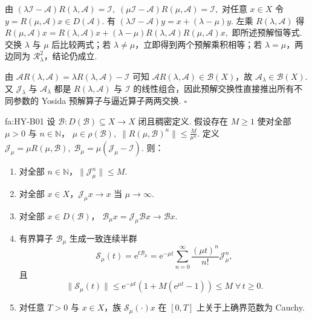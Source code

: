 \begin{FAProof}
由 \(\displaystyle (\lambda\mathcal I-\mathcal A)R(\lambda,\mathcal A)=\mathcal I, \; (\mu\mathcal I-\mathcal A)R(\mu,\mathcal A)=\mathcal I,\)
对任意 \(\displaystyle x\in X\) 令 \(\displaystyle y=R(\mu,\mathcal A)x\in D(\mathcal A)\). 有 \(\displaystyle (\lambda\mathcal I-\mathcal A)y = x+(\lambda-\mu)y.\)
左乘 \(\displaystyle R(\lambda,\mathcal A)\) 得 \(\displaystyle R(\mu,\mathcal A)x = R(\lambda,\mathcal A)x +(\lambda-\mu)R(\lambda,\mathcal A)R(\mu,\mathcal A)x,\)
即所述预解恒等式. 交换 \(\displaystyle\lambda\) 与 \(\displaystyle\mu\) 后比较两式；若 \(\displaystyle\lambda\neq\mu\)，立即得到两个预解乘积相等；若 \(\displaystyle\lambda=\mu\)，两边同为 \(\displaystyle\mathcal R_\lambda^2\)，结论仍成立.

由 \(\displaystyle \mathcal A R(\lambda,\mathcal A) = \lambda R(\lambda,\mathcal A)-\mathcal I\)
可知 \(\displaystyle\mathcal A R(\lambda,\mathcal A)\in\mathcal B(X)\)，故 \(\displaystyle\mathcal A_\lambda\in\mathcal B(X)\). 又 \(\displaystyle\mathcal J_\lambda\) 与 \(\displaystyle\mathcal A_\lambda\) 都是 \(\displaystyle R(\lambda,\mathcal A)\) 与 \(\displaystyle\mathcal I\) 的线性组合，因此预解交换性直接推出所有不同参数的 Yosida 预解算子与逼近算子两两交换.
\hfill\(\square\)
\end{FAProof}

\begin{FAProposition}{fa:HY-B01}
设 \(\displaystyle \mathcal B:D(\mathcal B)\subseteq X\to X\)
闭且稠密定义. 假设存在 \(\displaystyle M\geqslant1\) 使对全部 \(\displaystyle\mu>0\) 与 \(\displaystyle n\in\mathbb N\)， \(\displaystyle \mu\in\rho(\mathcal B), \; \|R(\mu,\mathcal B)^n\| \leqslant \frac{M}{\mu^n}.\)
定义 \(\displaystyle \mathcal J_\mu=\mu R(\mu,\mathcal B), \; \mathcal B_\mu=\mu(\mathcal J_\mu-\mathcal I).\)
则：
\begin{enumerate}[label=\textnormal{(\roman*)}]
\item 对全部 \(\displaystyle n\in\mathbb N\)，\(\displaystyle\|\mathcal J_\mu^n\|\leqslant M\).
\item 对全部 \(\displaystyle x\in X\)，\(\displaystyle\mathcal J_\mu x\to x\) 当 \(\displaystyle\mu\to\infty\).
\item 对全部 \(\displaystyle x\in D(\mathcal B)\)， \(\displaystyle \mathcal B_\mu x = \mathcal J_\mu\mathcal Bx \longrightarrow \mathcal Bx.\)
\item 有界算子 \(\displaystyle\mathcal B_\mu\) 生成一致连续半群
\[
\mathcal S_\mu(t)
=
\mathrm{e}^{t\mathcal B_\mu}
=
\mathrm{e}^{-\mu t}
\sum_{n=0}^{\infty}
\frac{(\mu t)^n}{n!}\mathcal J_\mu^n,
\]
且
\[
\|\mathcal S_\mu(t)\|
\leqslant
\mathrm{e}^{-\mu t}
\left(1+M(\mathrm{e}^{\mu t}-1)\right)
\leqslant M
\;
\forall\,t\geqslant0.
\]
\item 对任意 \(\displaystyle T>0\) 与 \(\displaystyle x\in X\)，族 \(\displaystyle\mathcal S_\mu(\cdot)x\) 在 \(\displaystyle[0,T]\) 上关于上确界范数为 Cauchy.
\end{enumerate}
\end{FAProposition}


